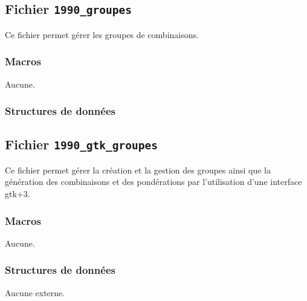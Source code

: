\documentclass{article}
\begin{document}
\subsection{Fichier {\texttt{1990\_groupes}}}
Ce fichier permet gérer les groupes de combinaisons.
\subsubsection{Macros}
Aucune.
\subsubsection{Structures de données}




























\subsection{Fichier {\texttt{1990\_gtk\_groupes}}}
Ce fichier permet gérer la création et la gestion des groupes ainsi que la génération des combinaisons et des pondérations par l'utilisation d'une interface gtk+3.
\subsubsection{Macros}
Aucune.
\subsubsection{Structures de données}
Aucune externe.


\end{document}
